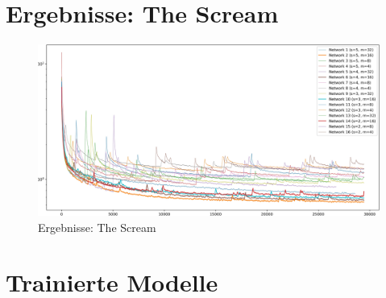 \section{Ergebnisse: The Scream}
\begin{figure}[H]
	\centering
	\includegraphics[width=1.00\textwidth]{resources/content/experiments/fast_loss_plot_experiment2.jpg}
	\caption{Ergebnisse: The Scream}
	\label{img:results_the_scream}
\end{figure}

\section{Trainierte Modelle}

